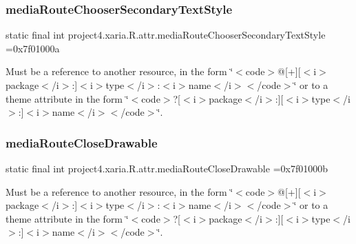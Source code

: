 \subsubsection{\texorpdfstring{media\+Route\+Chooser\+Secondary\+Text\+Style}{mediaRouteChooserSecondaryTextStyle}}
{\footnotesize\ttfamily static final int project4.\+xaria.\+R.\+attr.\+media\+Route\+Chooser\+Secondary\+Text\+Style =0x7f01000a\hspace{0.3cm}{\ttfamily [static]}}

Must be a reference to another resource, in the form \char`\"{}$<$code$>$@\mbox{[}+\mbox{]}\mbox{[}$<$i$>$package$<$/i$>$\+:\mbox{]}$<$i$>$type$<$/i$>$\+:$<$i$>$name$<$/i$>$$<$/code$>$\char`\"{} or to a theme attribute in the form \char`\"{}$<$code$>$?\mbox{[}$<$i$>$package$<$/i$>$\+:\mbox{]}\mbox{[}$<$i$>$type$<$/i$>$\+:\mbox{]}$<$i$>$name$<$/i$>$$<$/code$>$\char`\"{}. \mbox{\label{classproject4_1_1xaria_1_1R_1_1attr_a99f47f1840b6f949e05eed8bee125f0f}} 
\subsubsection{\texorpdfstring{media\+Route\+Close\+Drawable}{mediaRouteCloseDrawable}}
{\footnotesize\ttfamily static final int project4.\+xaria.\+R.\+attr.\+media\+Route\+Close\+Drawable =0x7f01000b\hspace{0.3cm}{\ttfamily [static]}}

Must be a reference to another resource, in the form \char`\"{}$<$code$>$@\mbox{[}+\mbox{]}\mbox{[}$<$i$>$package$<$/i$>$\+:\mbox{]}$<$i$>$type$<$/i$>$\+:$<$i$>$name$<$/i$>$$<$/code$>$\char`\"{} or to a theme attribute in the form \char`\"{}$<$code$>$?\mbox{[}$<$i$>$package$<$/i$>$\+:\mbox{]}\mbox{[}$<$i$>$type$<$/i$>$\+:\mbox{]}$<$i$>$name$<$/i$>$$<$/code$>$\char`\"{}. \mbox{\label{classproject4_1_1xaria_1_1R_1_1attr_afe4637aa896f5d10b0e2d8a3e198dab6}} 
